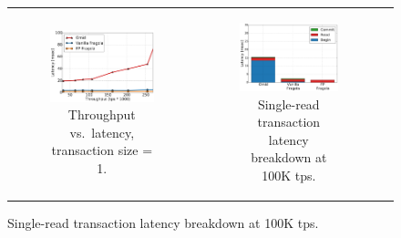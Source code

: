 \begin{figure}[t!]
\centering
\begin{tabular}{ccc}
      \begin{subfigure}[t]{0.31\textwidth}
      	\includegraphics[width=\textwidth]{figs/throughputlatency1.pdf}
	    \caption{Throughput vs.\ latency, transaction size = 1.}
        \label{fig:tl-1}      
      \end{subfigure} & 

      \begin{subfigure}[t]{0.31\textwidth}
      	\includegraphics[width=\textwidth]{figs/latency_Get.pdf}
        \caption[]{Single-read transaction latency breakdown at 100K tps.}
        \label{fig:stack-brc}
      \end{subfigure}  & 


\end{tabular}
\end{figure}
